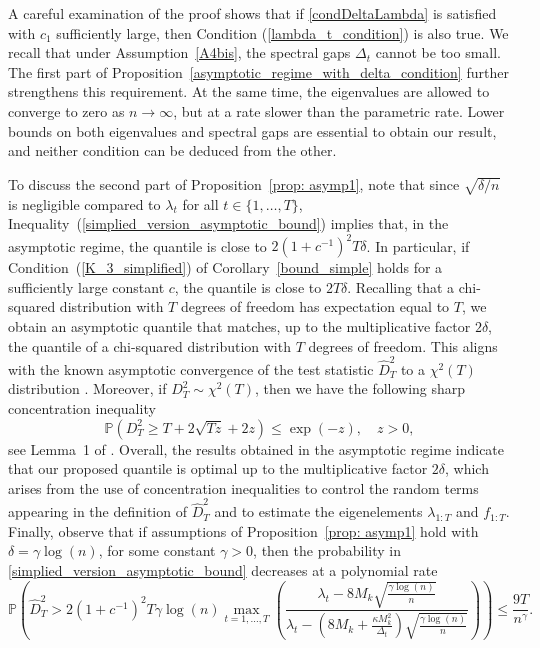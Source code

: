 \documentclass[twoside,11pt]{article}
\newcommand{\nb}{n}
\newcommand{\PPO}{\mathbb{P} }
\renewcommand{\P}{\mathbb{P}}
\begin{document}
A careful examination of the proof shows that if \eqref{condDeltaLambda} is satisfied with $c_1$ sufficiently large, then Condition (\ref{lambda_t_condition}) is also true.
We recall that under Assumption~\eqref{A4bis}, the spectral gaps $\Delta_t$ cannot be too small. The first part of Proposition~\ref{asymptotic_regime_with_delta_condition} further strengthens this requirement. At the same time, the eigenvalues are allowed to converge to zero as $n \to \infty$, but at a rate slower than the parametric rate. Lower bounds on both eigenvalues and spectral gaps are essential to obtain our result, and neither condition can be deduced from the other. 

To discuss the second part of Proposition~\ref{prop: asymp1}, note that since $\sqrt{\delta / \nb}$ is negligible compared to $\lambda_t$ for all $t \in \{1,\ldots,T\}$, Inequality~(\ref{simplied_version_asymptotic_bound}) implies that, in the asymptotic regime, the quantile is close to $2(1 + c^{-1})^2 T \delta$. In particular, if Condition~(\ref{K_3_simplified}) of Corollary~\ref{bound_simple} holds for a sufficiently large constant $c$, the quantile is close to $2T\delta$. Recalling that a chi-squared distribution with $T$ degrees of freedom has expectation equal to $T$, we obtain an asymptotic quantile that matches, up to the multiplicative factor $2\delta$, the quantile of a chi-squared distribution with $T$ degrees of freedom. This aligns with the known asymptotic convergence of the test statistic $\widehat{D}^2_T$ to a $\chi^2(T)$ distribution \citep{eric2007testing}. Moreover, if $D^2_T\sim\chi^2(T)$, then we have the following sharp concentration inequality
	$$\P(D^2_T\geq T+2\sqrt{Tz}+2z)\leq \exp(-z),\quad z>0,$$
	see Lemma~1 of \cite{LaurentMassart2000}. 
	Overall, the results obtained in the asymptotic regime indicate that our proposed quantile is optimal up to the multiplicative factor $2\delta$, which arises from the use of concentration inequalities to control the random terms appearing in the definition of $\widehat{D}^2_T$ and to estimate the eigenelements $\lambda_{1:T}$ and $f_{1:T}$. Finally, observe that if assumptions of Proposition~\ref{prop: asymp1} hold with $\delta=\gamma\log(n)$, for some constant $\gamma>0$, then the probability in \eqref{simplied_version_asymptotic_bound} decreases at a polynomial rate
	$$ \PPO \left(\widehat{D}^2_T > 2\left(1+c^{-1}\right)^2 T \gamma \log(\nb) \underset{t=1,\ldots,T}{\max}  \left(\frac{\lambda_t - 8 M_k \sqrt{\frac{\gamma \log(\nb) }{\nb}}}{\lambda_t - \left(8 M_k  + \frac{\kappa M_k^2}{\Delta_t} \right) \sqrt{\frac{\gamma \log(\nb) }{\nb}}}  \right) \right) \leq \frac{9 T}{\nb^{\gamma}}.$$
\end{document}
